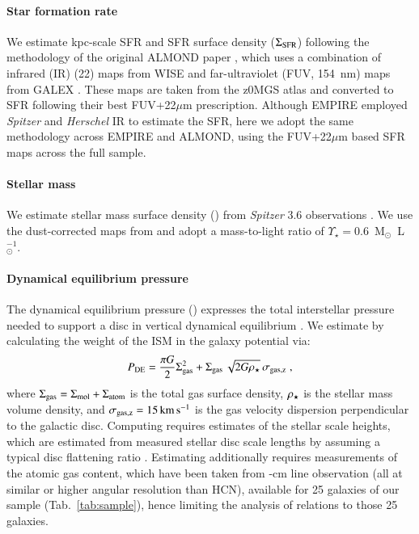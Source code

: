 \documentclass[letter, longauth]{aa} %
\begin{document}
\paragraph{Star formation rate}
We estimate kpc-scale SFR and SFR surface density ($\Sigma_{\rm SFR}$) following the methodology of the original ALMOND paper \citep{Neumann2023a}, which uses a combination of infrared (IR) (\SI{22}{\micron}) maps from WISE \citep{Wright2010} and far-ultraviolet (FUV, \SI{154}{nm}) maps from GALEX \citep{Martin2005}. These maps are taken from the z0MGS atlas \citep{Leroy2019} and converted to SFR following their best FUV+22$\mu$m prescription. Although EMPIRE employed \textit{Spitzer} and \textit{Herschel} IR to estimate the SFR, here we adopt the same methodology across EMPIRE and ALMOND, using the FUV+22$\mu$m based SFR maps across the full sample.

\paragraph{Stellar mass}
We estimate stellar mass surface density (\sigstar) from \textit{Spitzer} \SI{3.6}{\micron} observations \citep{Sheth2010,Querejeta2021b}. We use the dust-corrected maps from \citet{Querejeta2015} and adopt a mass-to-light ratio of $\Upsilon_\star = 0.6$~M$_\odot$~L$_\odot^{-1}$.

\paragraph{Dynamical equilibrium pressure}
The dynamical equilibrium pressure (\pde) expresses the total interstellar pressure needed to support a disc in vertical dynamical equilibrium \citep[e.g., see][]{Ostriker2022, Schinnerer2024}. We estimate \pde by calculating the weight of the ISM in the galaxy potential via:
\begin{align}
    P_{\text{DE}} = \dfrac{\pi G}{2}\Sigma_{\text{gas}}^2 + \Sigma_{\text{gas}} \, \sqrt{2G\rho_{\star}} \, \sigma_{\rm gas, z} \;,
\end{align}
where $\Sigma_{\text{gas}}=\Sigma_{\text{mol}} + \Sigma_{\text{atom}}$ is the total gas surface density, $\rho_{\star}$ is the stellar mass volume density, and $\sigma_{\rm gas, z}=\SI{15}{\km\per\s}$ \citep[e.g.][]{Sun2018} is the gas velocity dispersion perpendicular to the galactic disc.
Computing \rhostar requires estimates of the stellar scale heights, which are estimated from measured stellar disc scale lengths by assuming a typical disc flattening ratio \citep[see][for more details]{Sun2020b,Sun2022}.
Estimating \pde additionally requires measurements of the atomic gas content, which have been taken from -cm line observation (all at similar or higher angular resolution than HCN), available for 25 galaxies of our sample (Tab.~\ref{tab:sample}), hence limiting the analysis of \pde relations to those 25 galaxies.
\end{document}
